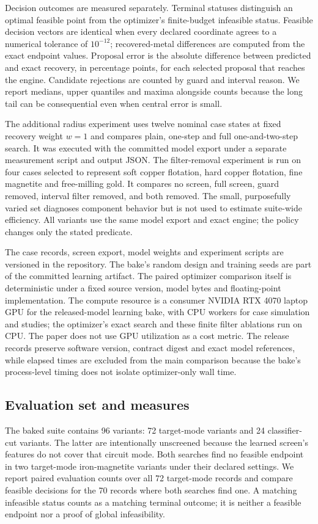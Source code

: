 \documentclass[10pt]{article}
\begin{document}
Decision outcomes are measured separately. Terminal statuses distinguish an optimal feasible point from the optimizer's finite-budget infeasible status. Feasible decision vectors are identical when every declared coordinate agrees to a numerical tolerance of $10^{-12}$; recovered-metal differences are computed from the exact endpoint values. Proposal error is the absolute difference between predicted and exact recovery, in percentage points, for each selected proposal that reaches the engine. Candidate rejections are counted by guard and interval reason. We report medians, upper quantiles and maxima alongside counts because the long tail can be consequential even when central error is small.

The additional radius experiment uses twelve nominal case states at fixed recovery weight $w=1$ and compares plain, one-step and full one-and-two-step search. It was executed with the committed model export under a separate measurement script and output JSON. The filter-removal experiment is run on four cases selected to represent soft copper flotation, hard copper flotation, fine magnetite and free-milling gold. It compares no screen, full screen, guard removed, interval filter removed, and both removed. The small, purposefully varied set diagnoses component behavior but is not used to estimate suite-wide efficiency. All variants use the same model export and exact engine; the policy changes only the stated predicate.

The case records, screen export, model weights and experiment scripts are versioned in the repository. The bake's random design and training seeds are part of the committed learning artifact. The paired optimizer comparison itself is deterministic under a fixed source version, model bytes and floating-point implementation. The compute resource is a consumer NVIDIA RTX 4070 laptop GPU for the released-model learning bake, with CPU workers for case simulation and studies; the optimizer's exact search and these finite filter ablations run on CPU. The paper does not use GPU utilization as a cost metric. The release records preserve software version, contract digest and exact model references, while elapsed times are excluded from the main comparison because the bake's process-level timing does not isolate optimizer-only wall time.

\subsection{Evaluation set and measures}
The baked suite contains 96 variants: 72 target-mode variants and 24 classifier-cut variants. The latter are intentionally unscreened because the learned screen's features do not cover that circuit mode. Both searches find no feasible endpoint in two target-mode iron-magnetite variants under their declared settings. We report paired evaluation counts over all 72 target-mode records and compare feasible decisions for the 70 records where both searches find one. A matching infeasible status counts as a matching terminal outcome; it is neither a feasible endpoint nor a proof of global infeasibility.
\end{document}
